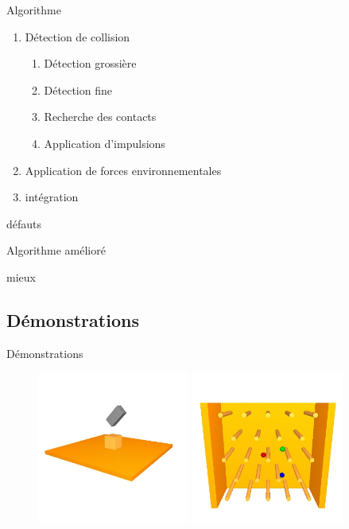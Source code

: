 \documentclass{beamer}
\begin{document}
\begin{frame}{Algorithme}
  \begin{enumerate}
  \item
    Détection de collision
    \begin{enumerate}
      \item Détection grossière
      \item Détection fine
      \item Recherche des contacts
      \item Application d'impulsions
    \end{enumerate}
  \item Application de forces environnementales
  \item intégration
  \end{enumerate}

  défauts
\end{frame}

\begin{frame}{Algorithme amélioré}

  mieux
\end{frame}

\subsection{Démonstrations}

\begin{frame}{Démonstrations}
  \begin{figure}
    \includegraphics[width=5cm]{images/box.jpg}
    \includegraphics[width=5cm]{images/pachinko.jpg}
  \end{figure}
\end{frame}
\end{document}
